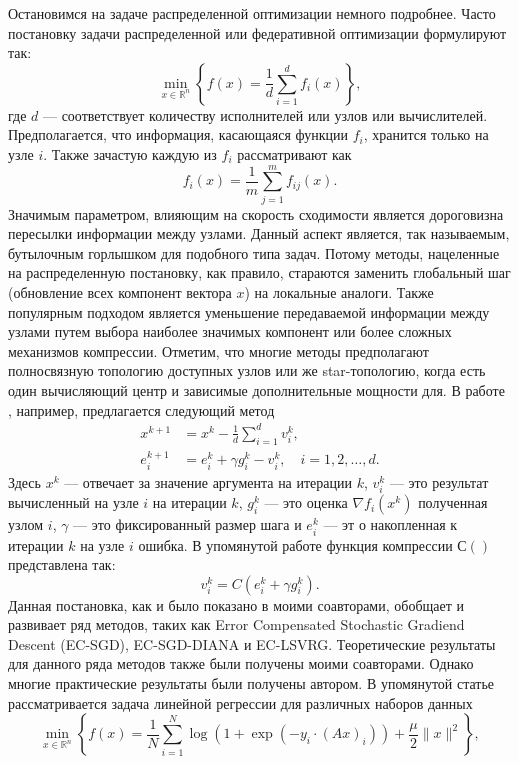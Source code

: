    Остановимся на задаче распределенной оптимизации немного подробнее. Часто постановку задачи распределенной или федеративной оптимизации формулируют так:
  $$
    \min_{x \in \mathbb{R}^n}\left\{f(x)=\frac{1}{d} \sum_{i=1}^d f_i(x)\right\},
  $$
  где $d$ --- соответствует количеству исполнителей или узлов или вычислителей. Предполагается, что информация, касающаяся функции $f_i$, хранится только на узле $i$. Также зачастую каждую из $f_i$ рассматривают как
  $$
    f_i(x) = \frac{1}{m} \sum_{j=1}^m f_{ij}(x).
  $$ 
  Значимым параметром, влияющим на скорость сходимости является дороговизна пересылки информации между узлами. Данный аспект является, так называемым, бутылочным горлышком для подобного типа задач. Потому методы, нацеленные на распределенную постановку, как правило, стараются заменить глобальный шаг (обновление всех компонент вектора $x$) на локальные аналоги. Также популярным подходом является уменьшение передаваемой информации между узлами путем выбора наиболее значимых компонент или более сложных механизмов компрессии. Отметим, что многие методы предполагают полносвязную топологию доступных узлов или же star-топологию, когда есть один вычисляющий центр и зависимые дополнительные мощности для. 
  В работе \cite{GorbunovKMR20}, например, предлагается следующий метод
  $$
  \begin{aligned} 
    x^{k+1} &=x^k-\frac{1}{d} \sum_{i=1}^d v_i^k, \\ 
    e_i^{k+1} &=e_i^k + \gamma g_i^k - v_i^k, \quad i=1,2, \ldots, d . 
  \end{aligned}
  $$
  Здесь $x^k$ --- отвечает за значение аргумента на итерации $k$, $v_i^k$ --- это результат вычисленный на узле $i$ на итерации $k$, $g_i^k$ --- это оценка $\nabla f_i(x^k)$ полученная узлом $i$, $\gamma$ --- это фиксированный размер шага и $e_i^k$ --- эт
  о накопленная к итерации $k$ на узле $i$ ошибка. В упомянутой работе функция компрессии $С()$ представлена так:
  $$
    v_i^k = C(e_i^k + \gamma g_i^k).
  $$
  Данная постановка, как и было показано в \cite{GorbunovKMR20} моими соавторами, обобщает и развивает ряд методов, таких как Error Compensated Stochastic Gradiend Descent (EC-SGD), EC-SGD-DIANA и EC-LSVRG. Теоретические результаты для данного ряда методов также были получены моими соавторами. Однако многие практические результаты были получены автором. В упомянутой статье рассматривается задача линейной регрессии для различных наборов данных
  $$
    \min_{x \in \mathbb{R}^n}\left\{ f(x) = \frac{1}{N} \sum_{i=1}^N \log \left(1+\exp \left(- y_i \cdot(A x)_i\right)\right) + \frac{\mu}{2}\|x\|^2 \right\},
  $$
